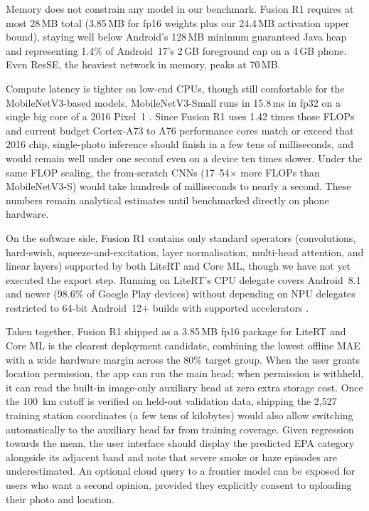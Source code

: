 \documentclass[conference]{IEEEtran}
\begin{document}
Memory does not constrain any model in our benchmark. Fusion R1 requires at most
28\,MB total (3.85\,MB for fp16 weights plus our 24.4\,MB activation upper
bound), staying well below Android's 128\,MB minimum guaranteed Java heap and
representing 1.4\% of Android~17's 2\,GB foreground cap on a 4\,GB phone. Even
ResSE, the heaviest network in memory, peaks at 70\,MB.

Compute latency is tighter on low-end CPUs, though still comfortable for the
MobileNetV3-based models. MobileNetV3-Small runs in 15.8\,ms in fp32 on a
single big core of a 2016 Pixel~1 \cite{howard2019mobilenetv3}. Since Fusion R1
uses 1.42 times those FLOPs and current budget Cortex-A73 to A76 performance
cores match or exceed that 2016 chip, single-photo inference should finish in a
few tens of milliseconds, and would remain well under one second even on a
device ten times slower. Under the same FLOP scaling, the from-scratch CNNs
(17--54$\times$ more FLOPs than MobileNetV3-S) would take hundreds of
milliseconds to nearly a second. These numbers remain analytical estimates until
benchmarked directly on phone hardware.

On the software side, Fusion R1 contains only standard operators (convolutions,
hard-swish, squeeze-and-excitation, layer normalisation, multi-head attention,
and linear layers) supported by both LiteRT and Core ML, though we have not yet
executed the export step. Running on LiteRT's CPU delegate covers Android~8.1
and newer (98.6\% of Google Play devices) without depending on NPU delegates
restricted to 64-bit Android~12+ builds with supported accelerators
\cite{litert2026}.

Taken together, Fusion R1 shipped as a 3.85\,MB fp16 package for LiteRT and
Core ML is the clearest deployment candidate, combining the lowest offline MAE
with a wide hardware margin across the 80\% target group. When the user grants
location permission, the app can run the main head; when permission is withheld,
it can read the built-in image-only auxiliary head at zero extra storage cost.
Once the 100~km cutoff is verified on held-out validation data, shipping the
2,527 training station coordinates (a few tens of kilobytes) would also allow
switching automatically to the auxiliary head far from training coverage. Given
regression towards the mean, the user interface should display the predicted
EPA category alongside its adjacent band and note that severe smoke or haze
episodes are underestimated. An optional cloud query to a frontier model can be
exposed for users who want a second opinion, provided they explicitly consent to
uploading their photo and location.
\end{document}
